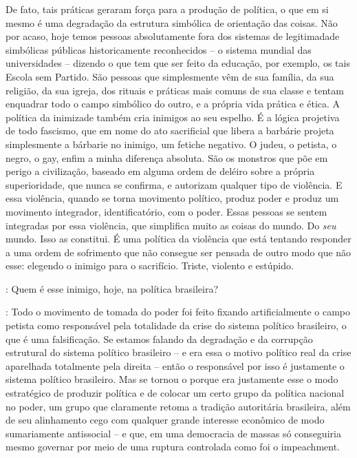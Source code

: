 De fato, tais práticas geraram força para a produção de política, o que
em si mesmo é uma degradação da estrutura simbólica de orientação das
coisas. Não por acaso, hoje temos pessoas absolutamente fora dos
sistemas de legitimadade simbólicas públicas historicamente reconhecidos
-- o sistema mundial das universidades -- dizendo o que tem que ser
feito da educação, por exemplo, os tais Escola sem Partido. São pessoas
que simplesmente vêm de sua família, da sua religião, da sua igreja, dos
rituais e práticas mais comuns de sua classe e tentam enquadrar todo o
campo simbólico do outro, e a própria vida prática e ética. A política
da inimizade também cria inimigos ao seu espelho. É a lógica projetiva
de todo fascismo, que em nome do ato sacrificial que libera a barbárie
projeta simplesmente a bárbarie no inimigo, um fetiche negativo. O
judeu, o petista, o negro, o gay, enfim a minha diferença absoluta. São
os monstros que põe em perigo a civilização, baseado em alguma ordem de
deléiro sobre a própria superioridade, que nunca se confirma, e
autorizam qualquer tipo de violência. E essa violência, quando se torna
movimento político, produz poder e produz um movimento integrador,
identificatório, com o poder. Essas pessoas se sentem integradas por
essa violência, que simplifica muito as coisas do mundo. Do \emph{seu}
mundo. Isso as constitui. É uma política da violência que está tentando
responder a uma ordem de sofrimento que não consegue ser pensada de
outro modo que não esse: elegendo o inimigo para o sacrifício. Triste,
violento e estúpido.

\medskip

\noindent{}: Quem é esse inimigo, hoje, na política brasileira?

\medskip

\noindent{}: Todo o movimento de tomada do poder foi feito fixando artificialmente o
campo petista como responsável pela totalidade da crise do sistema
político brasileiro, o que é uma falsificação. Se estamos falando da
degradação e da corrupção estrutural do sistema político brasileiro -- e
era essa o motivo político real da crise aparelhada totalmente pela
direita -- então o responsável por isso é justamente o sistema político
brasileiro. Mas se tornou o  porque era justamente esse o modo
estratégico de produzir política e de colocar um certo grupo da política
nacional no poder, um grupo que claramente retoma a tradição autoritária
brasileira, além de seu alinhamento cego com qualquer grande interesse
econômico de modo sumariamente antissocial -- e que, em uma democracia
de massas só conseguiria mesmo governar por meio de uma ruptura
controlada como foi o impeachment.

